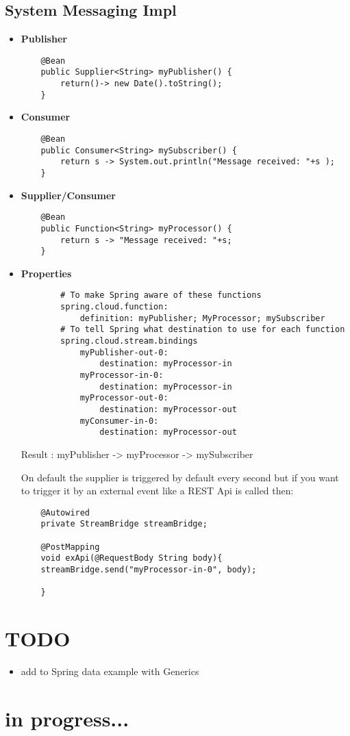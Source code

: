 \documentclass[a4paper, 12pt]{article}
\begin{document}
    \subsection{System Messaging Impl}
    \begin{itemize}
        \item \textbf{Publisher}
        \begin{lstlisting}
    @Bean
    public Supplier<String> myPublisher() {
        return()-> new Date().toString();
    }
        \end{lstlisting}
        \item \textbf{Consumer}
        \begin{lstlisting}
    @Bean
    public Consumer<String> mySubscriber() {
        return s -> System.out.println("Message received: "+s );
    }
        \end{lstlisting}
        \item \textbf{Supplier/Consumer}
        \begin{lstlisting}
    @Bean
    public Function<String> myProcessor() {
        return s -> "Message received: "+s;
    }
        \end{lstlisting}

        \item \textbf{Properties}
        \begin{lstlisting}
        # To make Spring aware of these functions
        spring.cloud.function:
            definition: myPublisher; MyProcessor; mySubscriber
        # To tell Spring what destination to use for each function
        spring.cloud.stream.bindings
            myPublisher-out-0:
                destination: myProcessor-in
            myProcessor-in-0:
                destination: myProcessor-in
            myProcessor-out-0:
                destination: myProcessor-out
            myConsumer-in-0:
                destination: myProcessor-out
        \end{lstlisting}
        Result : myPublisher -> myProcessor -> mySubscriber

        On default the supplier is triggered by default every second but if you want to trigger it by an external event like a REST Api is called then:
        \begin{lstlisting}
    @Autowired
    private StreamBridge streamBridge;

    @PostMapping
    void exApi(@RequestBody String body){
    streamBridge.send("myProcessor-in-0", body);

    }
        \end{lstlisting}
    \end{itemize}


    \section{TODO}
    \begin{itemize}
        \item add to Spring data example with Generics
    \end{itemize}

    \section{in progress...}
\end{document}
